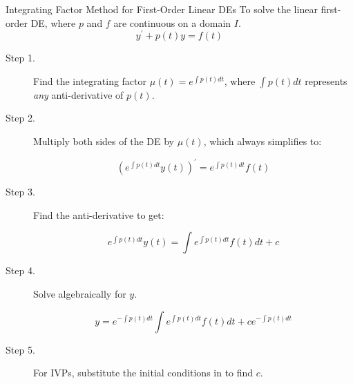 \documentclass{beamer}
\begin{document}
\begin{frame}
\begin{block}{Integrating Factor Method for First-Order Linear DEs}
\small
To solve the linear first-order DE, where $p$ and $f$ are continuous on a domain $I$.
\begin{equation*}
y^\prime + p(t) y = f(t)
\end{equation*}
\vspace{-6mm}
\begin{description}
\item[Step 1.] Find the integrating factor $\mu(t) = e^{\int p(t) dt}$, where $\int p(t) dt$ represents \emph{any} anti-derivative of $p(t)$.
\item[Step 2.] Multiply both sides of the DE by $\mu(t)$, which always simplifies to:

\vspace{-2mm}
\begin{equation*}
{\left(e^{\int p(t) dt} y(t)\right)}^\prime = e^{\int p(t) dt} f(t)
\end{equation*}
\item[Step 3.] Find the anti-derivative to get:

\vspace{-2mm}
\begin{equation*}
e^{\int p(t) dt} y(t) = \int e^{\int p(t) dt} f(t) dt +c
\end{equation*}
\item[Step 4.] Solve algebraically for $y$.

\vspace{-2mm}
\begin{equation*}
y = e^{-\int p(t) dt} \int e^{\int p(t) dt} f(t) dt + c e^{-\int p(t) dt}
\end{equation*}
\item[Step 5.] For IVPs, substitute the initial conditions in to find $c$.
\end{description}
\end{block}
\end{frame}
\end{document}
